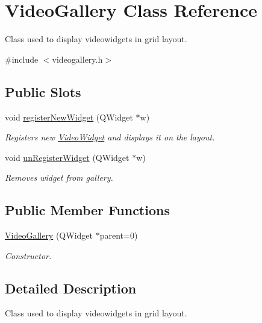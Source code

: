 \hypertarget{class_video_gallery}{
\section{VideoGallery Class Reference}
\label{dc/d09/class_video_gallery}
}


Class used to display videowidgets in grid layout.  




{\ttfamily \#include $<$videogallery.h$>$}

\subsection*{Public Slots}
\begin{DoxyCompactItemize}
\item 
void \hyperlink{class_video_gallery_ae6d5393ea251435d5560b982ea1e52bd}{registerNewWidget} (QWidget $\ast$w)
\begin{DoxyCompactList}\small\item\em Registers new \hyperlink{class_video_widget}{VideoWidget} and displays it on the layout. \item\end{DoxyCompactList}\item 
void \hyperlink{class_video_gallery_aed335710e346a87abbc86a6e86c65221}{unRegisterWidget} (QWidget $\ast$w)
\begin{DoxyCompactList}\small\item\em Removes widget from gallery. \item\end{DoxyCompactList}\end{DoxyCompactItemize}
\subsection*{Public Member Functions}
\begin{DoxyCompactItemize}
\item 
\hyperlink{class_video_gallery_aa20be933d1bfef5e9533ea255afc8142}{VideoGallery} (QWidget $\ast$parent=0)
\begin{DoxyCompactList}\small\item\em Constructor. \item\end{DoxyCompactList}\end{DoxyCompactItemize}


\subsection{Detailed Description}
Class used to display videowidgets in grid layout. 

